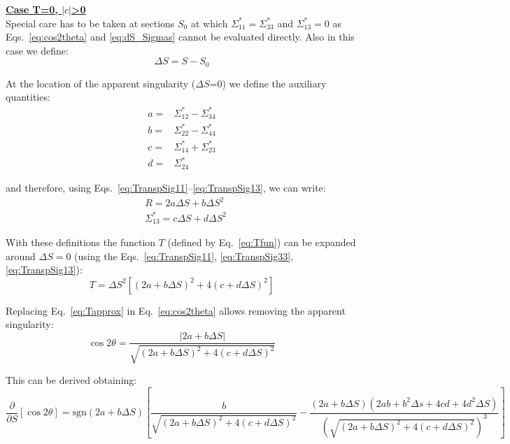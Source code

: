  
 
\textbf{\underline{Case T=0, $\left| c \right|$>0}}
~\\

Special care has to be taken at sections $S_0$ at which ${\Sigma}^*_{11}={\Sigma}^*_{33}$ and ${\Sigma}^*_{13}=0$ as Eqs.~\ref{eq:cos2theta}  and \ref{eq:dS_Sigmas} cannot be evaluated directly. Also in this case we define:
\begin{equation}
\Delta S = S - S_0
\end{equation}

At the location of the apparent singularity ($\Delta S$=0) we define the auxiliary quantities:
\begin{align}
a =& \Sigma^*_{12} - \Sigma^*_{34}\\
b =& \Sigma^*_{22} - \Sigma^*_{44}\\
c =& \Sigma^*_{14} + \Sigma^*_{23}\\
d =& \Sigma^*_{24} 
\end{align}

and therefore, using Eqs.~\ref{eq:TranspSig11}--\ref{eq:TranspSig13}, we can write:
\begin{align}
&R = 2a \Delta S + b \Delta S^2 \label{eq:specR}\\
&\Sigma^*_{13} =c \Delta S +d \Delta S^2\label{eq:specS13}
\end{align}

With these definitions the function $T$ (defined by Eq.~\ref{eq:Tfun}) can be expanded around $\Delta S =0$ (using the Eqs.~\ref{eq:TranspSig11}, \ref{eq:TranspSig33}, \ref{eq:TranspSig13}):
\begin{equation}
T = \Delta S^2\left[\left(2a +b \Delta S \right)^2 +4\left( c +d \Delta S\right)^2\right]
\label{eq:Tapprox}
\end{equation}

Replacing Eq.~\ref{eq:Tapprox} in Eq.~\ref{eq:cos2theta} allows  removing the apparent singularity:
\begin{equation}
\cos 2 \theta = \frac{\left| 2a+b \Delta S\right|}{\sqrt{\left(2a +b \Delta S \right)^2 +4\left( c +d \Delta S\right)^2}}
\label{eq:cost_spc}
\end{equation}

This can be derived obtaining:
\begin{equation}
\frac{\partial }{\partial S} \left[ \cos 2\theta \right] = \mathrm{sgn}(2a+b \Delta S)\left[
\frac{b}{\sqrt{\left(2a +b \Delta S \right)^2 +4\left( c +d \Delta S\right)^2}}-\frac{(2a+b\Delta S)(2ab+b^2 \Delta s +4 c d+ 4 d^2 \Delta S)}{\left(\sqrt{\left(2a +b \Delta S \right)^2 +4\left( c +d \Delta S\right)^2}\right)^3}
\right]
\end{equation}

